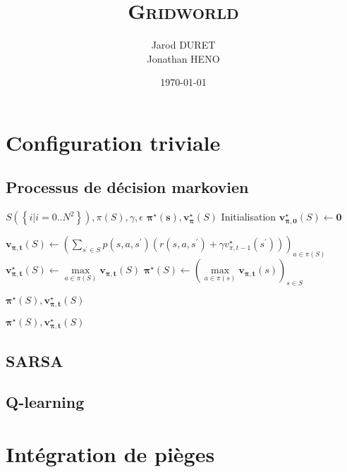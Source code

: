 \documentclass{cfg}
\title{\textsc{Gridworld}}
\author{Jarod DURET\\ Jonathan HENO}
\date{\today}
\begin{document}
\section{Configuration triviale}
\subsection{Processus de décision markovien}
\begin{algorithmic} 
    \REQUIRE $S(\left\{i|i=0..N^2\right\}), \pi(S), \gamma, \epsilon$
    \ENSURE $\mathbf{\pi^\star}(\mathbf{s}), \mathbf{v_{\pi}^{\star}}(S)$
    \STATE\COMMENT Initialisation
    \STATE $\mathbf{v^{\star}_{\pi, 0}}(S) \gets \mathbf{0}$

            \STATE $
                \mathbf{v_{\pi, t}}(S) 
                \gets 
                \left(
                    \sum\limits_{s^\prime \in S} 
                    p(s, a, s^\prime)\left( 
                        r(s, a, s^\prime) 
                        + \gamma v_{\pi, t-1}^{\star}(s^\prime) 
                    \right)
                \right)_{a\in\pi(S)}
            $
            \STATE $
                \mathbf{v_{\pi, t}^{\star}}(S) 
                \gets 
                \max\limits_{a \in \pi(S)}
                \mathbf{v_{\pi, t}}(S)
            $
            \STATE $
                \mathbf{\pi^\star}(S) 
                \gets 
                \left(
                    \max\limits_{a \in \pi(s)}
                    \mathbf{v_{\pi, t}}(s)
                \right)_{s\in S}
            $

                \RETURN $\mathbf{\pi^\star}(S), \mathbf{v_{\pi, t}^{\star}}(S)$
            \ENDIF
        \ENDFOR
    \ENDFOR
    
    \RETURN $\mathbf{\pi^\star}(S), \mathbf{v_{\pi, t}^{\star}}(S)$
\end{algorithmic}

\subsection{SARSA}


\subsection{Q-learning}


\section{Intégration de pièges}
\end{document}
